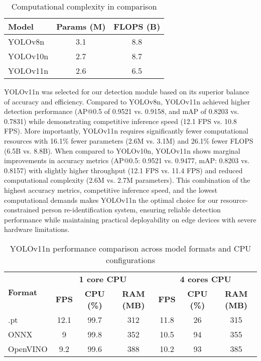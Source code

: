\begin{table}[h]
\centering
\caption{Computational complexity in comparison}
\label{tab:computational_complexity}
\begin{tabular}{|l|c|c|}
\hline
\textbf{Model} & \textbf{Params (M)} & \textbf{FLOPS (B)} \\
\hline
YOLOv8n & 3.1 & 8.8 \\
\hline
YOLOv10n & 2.7 & 8.7 \\
\hline
YOLOv11n & 2.6 & 6.5 \\
\hline
\end{tabular}
\end{table}

YOLOv11n was selected for our detection module based on its superior balance of accuracy and efficiency. Compared to YOLOv8n, YOLOv11n achieved higher detection performance (AP@0.5 of 0.9521 vs. 0.9158, and mAP of 0.8203 vs. 0.7831) while demonstrating competitive inference speed (12.1 FPS vs. 10.8 FPS). More importantly, YOLOv11n requires significantly fewer computational resources with 16.1\% fewer parameters (2.6M vs. 3.1M) and 26.1\% fewer FLOPS (6.5B vs. 8.8B). When compared to YOLOv10n, YOLOv11n shows marginal improvements in accuracy metrics (AP@0.5: 0.9521 vs. 0.9477, mAP: 0.8203 vs. 0.8157) with slightly higher throughput (12.1 FPS vs. 11.4 FPS) and reduced computational complexity (2.6M vs. 2.7M parameters). This combination of the highest accuracy metrics, competitive inference speed, and the lowest computational demands makes YOLOv11n the optimal choice for our resource-constrained person re-identification system, ensuring reliable detection performance while maintaining practical deployability on edge devices with severe hardware limitations.

\begin{table}[h]
\centering
\caption{YOLOv11n performance comparison across model formats and CPU configurations}
\label{tab:yolov11n_performance}
\begin{tabular}{|l|c|c|c|c|c|c|}
\hline
\multirow{2}{*}{\textbf{Format}} & \multicolumn{3}{c|}{\textbf{1 core CPU}} & \multicolumn{3}{c|}{\textbf{4 cores CPU}} \\
\cline{2-7}
 & \textbf{FPS} & \textbf{CPU (\%)} & \textbf{RAM (MB)} & \textbf{FPS} & \textbf{CPU (\%)} & \textbf{RAM (MB)} \\
\hline
.pt & 12.1 & 99.7 & 312 & 11.8 & 26 & 315 \\
\hline
ONNX & 9 & 99.8 & 352 & 10.5 & 94 & 355 \\
\hline
OpenVINO & 9.2 & 99.6 & 388 & 10.2 & 93 & 385 \\
\hline
\end{tabular}
\end{table}

